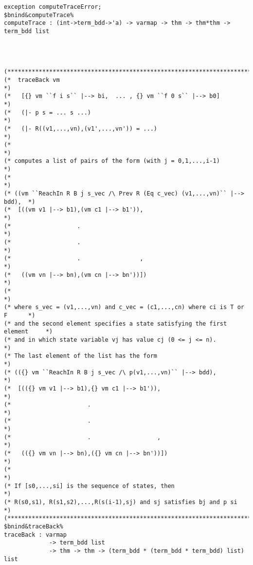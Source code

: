 \documentclass[12pt]{article}
\begin{document}
\begin{footnotesize}
\begin{Verbatim}[commandchars=\$\&\%]
exception computeTraceError;
$bnind&computeTrace%
computeTrace : (int->term_bdd->'a) -> varmap -> thm -> thm*thm -> term_bdd list




(*****************************************************************************)
(*  traceBack vm                                                             *)
(*   [{} vm ``f i s`` |--> bi,  ... , {} vm ``f 0 s`` |--> b0]               *)
(*   (|- p s = ... s ...)                                                    *)
(*   (|- R((v1,...,vn),(v1',...,vn')) = ...)                                 *)
(*                                                                           *)
(* computes a list of pairs of the form (with j = 0,1,...,i-1)               *)
(*                                                                           *)
(* ((vm ``ReachIn R B j s_vec /\ Prev R (Eq c_vec) (v1,...,vn)`` |--> bdd),  *)
(*  [((vm v1 |--> b1),(vm c1 |--> b1')),                                     *)
(*                   .                                                       *)
(*                   .                                                       *)
(*                   .                 ,                                     *)
(*   ((vm vn |--> bn),(vm cn |--> bn'))])                                    *)
(*                                                                           *)
(* where s_vec = (v1,...,vn) and c_vec = (c1,...,cn) where ci is T or F      *)
(* and the second element specifies a state satisfying the first element     *)
(* and in which state variable vj has value cj (0 <= j <= n).                *)
(* The last element of the list has the form                                 *)
(* (({} vm ``ReachIn R B j s_vec /\ p(v1,...,vn)`` |--> bdd),                *)
(*  [(({} vm v1 |--> b1),{} vm c1 |--> b1')),                                *)
(*                      .                                                    *)
(*                      .                                                    *)
(*                      .                   ,                                *)
(*   (({} vm vn |--> bn),({} vm cn |--> bn'))])                              *)
(*                                                                           *)
(* If [s0,...,si] is the sequence of states, then                            *)
(* R(s0,s1), R(s1,s2),...,R(s(i-1),sj) and sj satisfies bj and p si          *)
(*****************************************************************************)
$bnind&traceBack%
traceBack : varmap 
             -> term_bdd list 
             -> thm -> thm -> (term_bdd * (term_bdd * term_bdd) list) list
\end{Verbatim}
\end{footnotesize}
\end{document}
